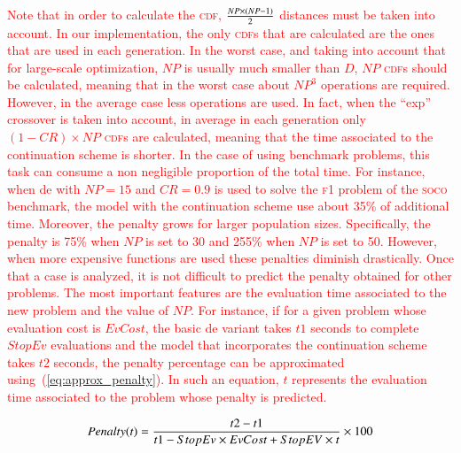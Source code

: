 \documentclass[review,3p]{elsarticle}
\newcommand{\DE}{{\sc de}}
\begin{document}
\textcolor{red}{
Note that in order to calculate the \textsc{cdf}, ${{NP \times (NP - 1)}\over{2}}$ distances must be taken into account.
%
In our implementation, the only \textsc{cdf}s that are calculated are the ones that are used in each generation.
%
In the worst case, and taking into account that for large-scale optimization, $NP$ is usually much smaller than $D$, $NP$ \textsc{cdf}s should be calculated,
meaning that in the worst case about $NP^3$ operations are required.
%
However, in the average case less operations are used.
%
In fact, when the ``exp'' crossover is taken into account, in average in each generation only $(1 - CR) \times NP$ \textsc{cdf}s are calculated, meaning
that the time associated to the continuation scheme is shorter.
%
In the case of using benchmark problems, this task can consume a non negligible proportion of the total time.
%
For instance, when \DE{} with $NP = 15$ and $CR = 0.9$ is used to solve the \textsc{f1} problem of the \textsc{soco} benchmark, the model with the continuation
scheme use about 35\% of additional time.
%
Moreover, the penalty grows for larger population sizes.
%
Specifically, the penalty is 75\% when $NP$ is set to 30 and 255\% when $NP$ is set to 50.
%
However, when more expensive functions are used these penalties diminish drastically.
%
Once that a case is analyzed, it is not difficult to predict the penalty obtained for other problems.
%
The most important features are the evaluation time associated to the new problem and the value of $NP$.
%
For instance, if for a given problem whose evaluation cost is $EvCost$, the basic \DE{} variant takes $t1$ seconds to complete $StopEv$ evaluations
and the model that incorporates the continuation scheme takes $t2$ seconds, the penalty percentage can be approximated using~(\ref{eq:approx_penalty}).
%
In such an equation, $t$ represents the evaluation time associated to the problem whose penalty is predicted.
}
%

\begin{equation}
	\label{eq:approx_penalty}
		Penalty(t) = {{t2-t1}\over{t1 -StopEv \times EvCost + StopEV \times t}} \times 100
\end{equation}
\end{document}
